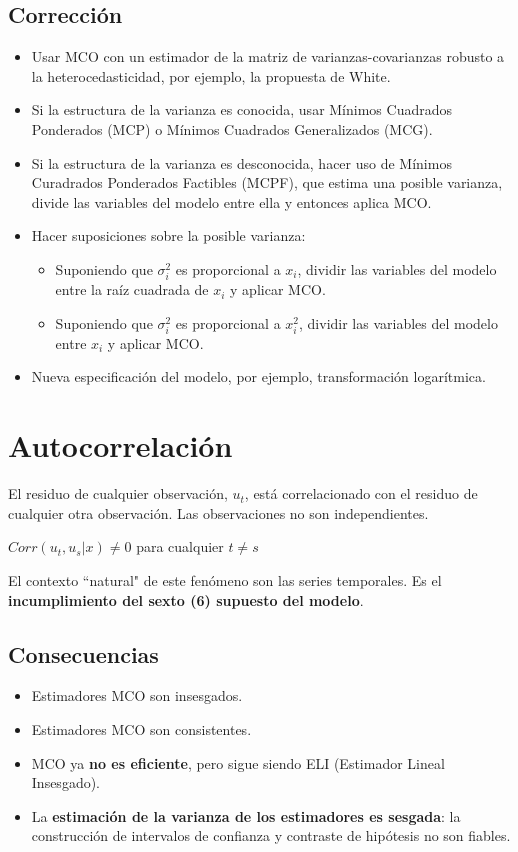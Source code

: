 \documentclass[10pt, a4paper, landscape]{extarticle}
\begin{document}
\begin{multicols}{3}
	\subsection*{Corrección}
		\begin{itemize}[leftmargin=*]
			\item Usar MCO con un estimador de la matriz de varianzas-covarianzas robusto a la heterocedasticidad, por ejemplo, la propuesta de White.
			\item Si la estructura de la varianza es conocida, usar Mínimos Cuadrados Ponderados (MCP) o Mínimos Cuadrados Generalizados (MCG).
			\item Si la estructura de la varianza es desconocida, hacer uso de Mínimos Curadrados Ponderados Factibles (MCPF), que estima una posible varianza, divide las variables del modelo entre ella y entonces aplica MCO.
			\item Hacer suposiciones sobre la posible varianza:
			\begin{itemize}[leftmargin=*]
				\item Suponiendo que $\sigma_i^2$ es proporcional a $x_i$, dividir las variables del modelo entre la raíz cuadrada de $x_i$ y aplicar MCO.
				\item Suponiendo que $\sigma_i^2$ es proporcional a $x_i^2$, dividir las variables del modelo entre $x_i$ y aplicar MCO.
			\end{itemize}
			\item Nueva especificación del modelo, por ejemplo, transformación logarítmica.
	\end{itemize}
\columnbreak
\section*{Autocorrelación}
	El residuo de cualquier observación, $u_t$, está correlacionado con el residuo de cualquier otra observación. Las observaciones no son independientes.
	\begin{center}
		$Corr(u_t, u_s | x) \neq 0$ para cualquier $t \neq s$
	\end{center}
	El contexto ``natural" de este fenómeno son las series temporales. Es el \textbf{incumplimiento del sexto (6) supuesto del modelo}.
	\subsection*{Consecuencias}
		\begin{itemize}[leftmargin=*]
			\item Estimadores MCO son insesgados.
			\item Estimadores MCO son consistentes.
			\item MCO ya \textbf{no es eficiente}, pero sigue siendo ELI (Estimador Lineal Insesgado).
			\item La \textbf{estimación de la varianza de los estimadores es sesgada}: la construcción de intervalos de confianza y contraste de hipótesis no son fiables.
		\end{itemize}

\end{multicols}
\end{document}
